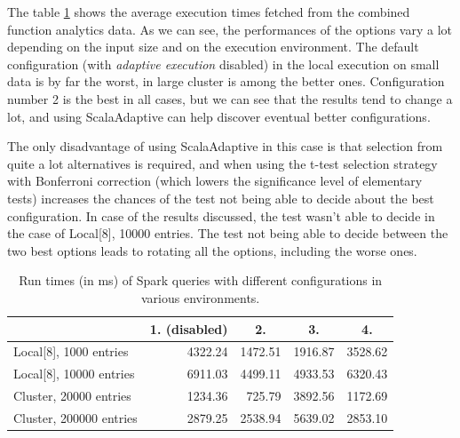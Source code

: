 The table \ref{tab:spark_adaptive_config_test} shows the average execution times fetched from the combined function analytics data. As we can see, the performances of the options vary a lot depending on the input size and on the execution environment. The default configuration (with \textit{adaptive execution} disabled) in the local execution on small data is by far the worst, in large cluster is among the better ones. Configuration number 2 is the best in all cases, but we can see that the results tend to change a lot, and using ScalaAdaptive can help discover eventual better configurations.

The only disadvantage of using ScalaAdaptive in this case is that selection from quite a lot alternatives is required, and when using the t-test selection strategy with Bonferroni correction (which lowers the significance level of elementary tests) increases the chances of the test not being able to decide about the best configuration. In case of the results discussed, the test wasn't able to decide in the case of Local[8], 10000 entries. The test not being able to decide between the two best options leads to rotating all the options, including the worse ones.

\begin{table}[h!]
	\centering
	\captionsetup{justification=centering,margin=0.5cm}
	\bgroup
	\def\arraystretch{1.5}%
	\begin{tabular}{|l|r|r|r|r|}
		\hline
		& \multicolumn{1}{c|}{\textbf{1. (disabled)}} & \multicolumn{1}{c|}{\textbf{2.}} & \multicolumn{1}{c|}{\textbf{3.}} & \multicolumn{1}{c|}{\textbf{4.}} \\ \hline
		Local{[}8{]}, 1000 entries  & 4322.24                                     & 1472.51                          & 1916.87                          & 3528.62                          \\ \hline
		Local{[}8{]}, 10000 entries & 6911.03                                     & 4499.11                          & 4933.53                          & 6320.43                          \\ \hline
		Cluster, 20000 entries      & 1234.36                                     & 725.79                           & 3892.56                          & 1172.69                          \\ \hline
		Cluster, 200000 entries     & 2879.25                                     & 2538.94                          & 5639.02                          & 2853.10                          \\ \hline
	\end{tabular}
\egroup
\caption{Run times (in ms) of Spark queries with different configurations in various environments.}
\label{tab:spark_adaptive_config_test}
\end{table}

